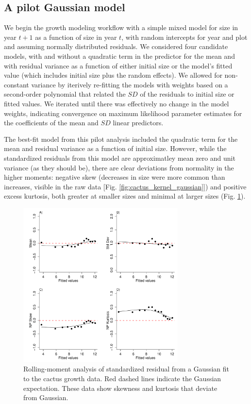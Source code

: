 \documentclass[11pt]{article}
\begin{document}
{\subsection{A pilot Gaussian model}
We begin the growth modeling workflow with a simple mixed model for size in year $t+1$ as a function of size in year $t$, with random intercepts for year and plot and assuming normally distributed residuals. 
We considered four candidate models, with and without a quadratic term in the predictor for the mean and with residual variance as a function of either initial size or the model's fitted value (which includes initial size plus the random effects).
We allowed for non-constant variance by iterively re-fitting the models with weights based on a second-order polynomial that related the $SD$ of the residuals to initial size or fitted values. 
We iterated until there was effectively no change in the model weights, indicating convergence on maximum likelihood parameter estimates for the coefficients of the mean and $SD$ linear predictors. 

The best-fit model from this pilot analysis included the quadratic term for the mean and residual variance as a function of initial size. 
However, while the standardized residuals from this model are approximatley mean zero and unit variance (as they should be), there are clear deviations from normality in the higher moments: negative skew (decreases in size were more common than increases, visible in the raw data [Fig. \ref{fig:cactus_kernel_gaussian}]) and positive excess kurtosis, both greater at smaller sizes and minimal at larger sizes (Fig. \ref{fig:cactus_rolling_moments}). 

\begin{figure}
\centering
\includegraphics[width=0.75\textwidth]{figures/cactus_rolling_moments}
\caption{Rolling-moment analysis of standardized residual from a Gaussian fit to the cactus growth data. Red dashed lines indicate the Gaussian expectation. These data show skewness and kurtosis that deviate from Gaussian.}
\label{fig:cactus_rolling_moments}
\end{figure} 

}
\end{document}
